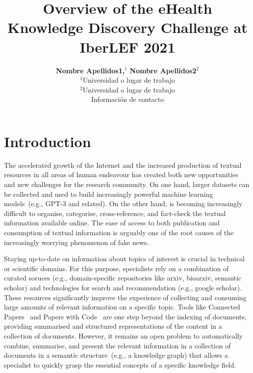 \documentclass[a4paper,11pt,twocolumn,twoside]{article}
\title{Overview of the eHealth Knowledge Discovery Challenge at IberLEF 2021}
\author {\textbf{Nombre Apellidos1,$^1$} \textbf{Nombre Apellidos2$^2$}\\
$^1$Universidad o lugar de trabajo\\
$^2$Universidad o lugar de trabajo\\
Información de contacto\\
}
\begin{document}


\label{firstpage} \maketitle

%

\section{Introduction}


The accelerated growth of the Internet and the increased production of textual resources in all areas of human endeavour has created both new opportunities and new challenges for the research community.
On one hand, larger datasets can be collected and used to build increasingly powerful machine learning models~(e.g., GPT-3 and related).
On the other hand, is becoming increasingly difficult to organise, categorise, cross-reference, and fact-check the textual information available online.
The ease of access to both publication and consumption of textual information is arguably one of the root causes of the increasingly worrying phenomenon of fake news.

Staying up-to-date on information about topics of interest is crucial in technical or scientific domains.
For this purpose, specialists rely on a combination of curated soruces (e.g., domain-specific repositories like arxiv, bioarxiv, semantic scholar) and technologies for search and recommendation (e.g., google scholar).
These resources significantly improve the experience of collecting and consuming large amounts of relevant information on a specific topic.
Tools like Connected Papers~\cite{} and Papers with Code~\cite{} are one step beyond the indexing of documents, providing summarised and structured representations of the content in a collection of documents.
However, it remains an open problem to automatically combine, summarise, and present the relevant information in a collection of documents in a semantic structure~(e.g., a knowledge graph) that allows a specialist to quickly grasp the essential concepts of a specific knowledge field.
\end{document}
